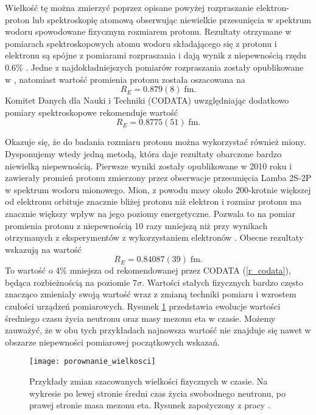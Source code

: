 \documentclass[11pt]{book}
\theoremstyle{definition}
\begin{document}
Wielkość tę można zmierzyć poprzez opisane powyżej rozpraszanie elektron-proton lub spektroskopię atomową obserwując niewielkie przesunięcia w spektrum wodoru spowodowane fizycznym rozmiarem protonu. Rezultaty otrzymane w pomiarach spektroskopowych atomu wodoru składającego się z protonu i elektronu są spójne z pomiarami rozpraszania i dają wynik z niepewnością rzędu 0.6\% \cite{Carlson:2015jba}. Jedne z najdokładniejszych pomiarów rozpraszania zostały opublikowane w \cite{Bernauer:2010wm}, natomiast wartość promienia protonu została oszacowana na
%
\begin{equation}
R_E = 0.879(8) \; \text{fm}.
\end{equation}
%
Komitet Danych dla Nauki i Techniki (CODATA) uwzględniając dodatkowo pomiary spektroskopowe rekomenduje wartość \cite{2012RvMP...84.1527M}
%
\begin{equation}
R_E = 0.8775(51) \; \text{fm}. \label{r_codata}
\end{equation}

Okazuje się, że do badania rozmiaru protonu można wykorzystać również miony. Dysponujemy wtedy jedną metodą, która daje rezultaty obarczone bardzo niewielką niepewnością. Pierwsze wyniki zostały opublikowane w 2010 roku \cite{2010Nature..Pohl} i zawierały promień protonu zmierzony przez obserwacje przesunięcia Lamba 2S-2P w spektrum wodoru mionowego. Mion, z powodu masy około 200-krotnie większej od elektronu orbituje znacznie bliżej protonu niż elektron i rozmiar protonu ma znacznie większy wpływ na jego poziomy energetyczne. Pozwala to na pomiar promienia protonu z niepewnością 10 razy mniejszą niż przy wynikach otrzymanych z eksperymentów z wykorzystaniem elektronów \cite{Carlson:2015jba}.  Obecne rezultaty wskazują na wartość \cite{Antognini417}
%
\begin{equation}
R_E = 0.84087(39) \; \text{fm}.
\end{equation}
%
To wartość o 4\% mniejsza od rekomendowanej przez CODATA (\ref{r_codata}), będąca rozbieżnością na poziomie $7\sigma$. Wartości stałych fizycznych bardzo często znacząco zmieniały swoją wartość wraz z zmianą techniki pomiaru i wzrostem czułości urządzeń pomiarowych. Rysunek \ref{fig:porownaniewielkosci} przedstawia ewolucje wartości średniego czasu życia neutronu oraz masy mezonu eta w czasie. Możemy zauważyć, że w obu tych przykładach najnowsza wartość nie znajduje się nawet w obszarze niepewności pomiarowej początkowych wskazań.


\begin{figure}[h!]
	\centering
	\texttt{[image: porownanie\_wielkosci]}
	\caption{Przykłady zmian szacowanych wielkości fizycznych w czasie. Na wykresie po lewej stronie średni czas życia swobodnego neutronu, po prawej stronie masa mezonu eta. Rysunek zapożyczony z pracy \cite{PhysRevD.86.010001}.}
	\label{fig:porownaniewielkosci}
\end{figure}
\end{document}
